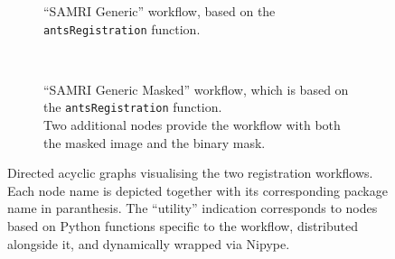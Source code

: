 
\begin{figure*}[h!]
    \begin{subfigure}{0.70\textwidth}
        \centering
        \vspace{-1.9em}
        \caption{
        “SAMRI Generic” workflow, based on the \textcolor{mg}{\texttt{antsRegistration}} function.
        }
        \label{fig:nwfgg}
    \end{subfigure}
    \\
    \begin{subfigure}{0.70\linewidth}
        \centering
        \vspace{-1.9em}
        \caption{
        “SAMRI Generic Masked” workflow, which is based on the \textcolor{mg}{\texttt{antsRegistration}} function.\\
        Two additional nodes provide the workflow with both the masked image and the binary mask.
        }
        \label{fig:nwfgl}
    \end{subfigure}\hfill
    \caption{
    Directed acyclic graphs visualising the two registration workflows.
    Each node name is depicted together with its corresponding package name in paranthesis.
    The “utility” indication corresponds to nodes based on Python functions specific to the workflow, distributed alongside it, and dynamically wrapped via Nipype.
    }
    \label{fig:nwfg}
\end{figure*}

